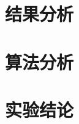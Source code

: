 \documentclass[11pt]{article}
\begin{document}
\section{结果分析}

\section{算法分析}

\section{实验结论}
\end{document}
